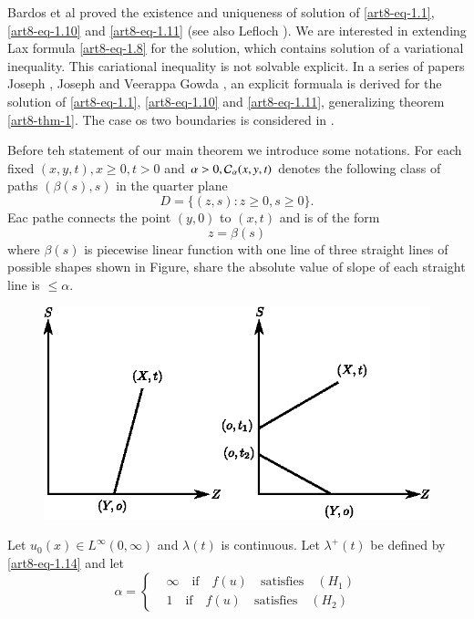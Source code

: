 Bardos et al \cite{art8-key1} proved the existence and uniqueness of solution of \eqref{art8-eq-1.1}, \eqref{art8-eq-1.10} and \eqref{art8-eq-1.11} (see also Lefloch \cite{art8-key10}). We are interested in extending Lax formula \eqref{art8-eq-1.8} for the solution, which contains solution of a variational inequality. This cariational inequality is not solvable explicit. In a series of papers Joseph \cite{art8-key3}, Joseph and Veerappa Gowda
\cite{art8-key4, art8-key5}, an explicit formuala is derived for the solution of \eqref{art8-eq-1.1}, \eqref{art8-eq-1.10}
and \eqref{art8-eq-1.11}, generalizing theorem \ref{art8-thm-1}. The case os two boundaries is considered in
\cite{art8-key6}.

Before teh statement of our main theorem we introduce some notations. For each fixed $(x,y,t),x \geq 0, t > 0$ and $\alpha > 0, \mathcal{C}_{\alpha}(x,y,t)$ denotes the following class of paths $(\beta(s), s)$ in the quarter plane
$$
D = \{(z,s): z\geq 0, s \geq 0\}.
$$
Eac pathe connects the point $(y,0)$ to $(x,t)$ and is of the form
$$
z=\beta(s)
$$
where $\beta(s)$ is piecewise linear function with one line of three straight lines of possible shapes shown in Figure, share the absolute value of slope of each straight line is $\leq \alpha$.
\begin{figure}[H]
\centering
\includegraphics[scale=0.9]{figures/figure-art8.eps}
\end{figure}
 Let $u_{0}(x)\in L^{\infty}(0,\infty)$ and $\lambda(t)$ is continuous. Let $\lambda^{+}(t)$ be defined by
 \eqref{art8-eq-1.14} and let
 \begin{equation}\label{art8-eq-1.16}
 \alpha =\left\{
 \begin{aligned}
&\infty \quad\text{if}\quad f(u)\quad \text{satisfies}\quad (H_{1})\\
&1\quad  \text{if}\quad f(u)\quad \text{satisfies}\quad (H_{2})
 \end{aligned}
\right.
 \end{equation}
